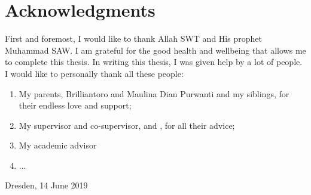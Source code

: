 \chapter*{Acknowledgments}

First and foremost, I would like to thank Allah SWT and His prophet Muhammad SAW.
I am grateful for the good health and wellbeing that allows me to complete this thesis.
In writing this thesis, I was given help by a lot of people.
I would like to personally thank all these people:

\begin{enumerate}
    \item My parents, Brilliantoro and Maulina Dian Purwanti and my siblings, for their endless love and support;
    \item My supervisor and co-supervisor, \pembimbing and \pembimbingDua, for all their advice;
    \item My academic advisor
    \item ...
\end{enumerate}

\vspace*{0.1cm}
\begin{flushright}
Dresden, 14 June 2019\\[0.1cm]
\vspace*{1cm}
\penulis

\end{flushright}